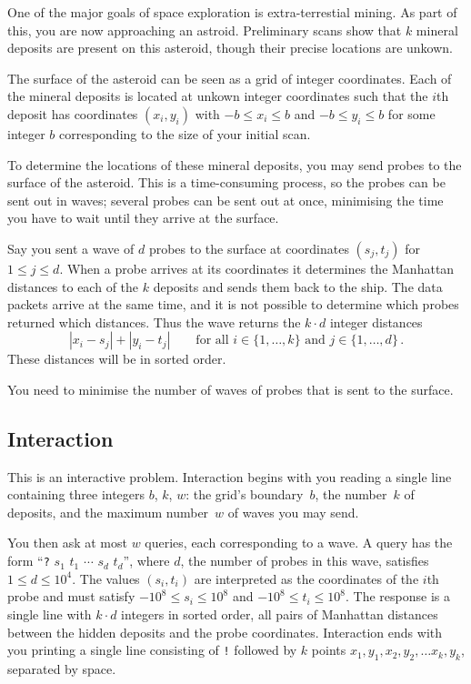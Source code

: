 
One of the major goals of space exploration is extra-terrestial mining. 
As part of this, you are now approaching an astroid. 
Preliminary scans show that $k$ mineral deposits are present on this asteroid, though their precise locations are unkown.

\medskip

The surface of the asteroid can be seen as a grid of integer coordinates.
Each of the mineral deposits is located at unkown integer coordinates such that the $i$th deposit has coordinates $(x_i, y_i)$ with  
$-b \le x_i \le b$ and $-b\le y_i \le b$ %
for some integer $b$ corresponding to the size of your initial scan.

To determine the locations of these mineral deposits, you may send probes to the surface of the asteroid. 
This is a time-consuming process, so the probes can be sent out in waves;
several probes can be sent out at once, minimising the time you have to wait until they arrive at the surface.

Say you sent a wave of $d$ probes to the surface at coordinates $(s_j,t_j)$ for $1\leq j\leq d$.
When a probe arrives at its coordinates it determines the Manhattan distances to each of the $k$ deposits and sends them back to the ship. 
The data packets arrive at the same time, and it is not possible to determine which probes returned which distances. 
Thus the wave returns the $k\cdot d$ integer distances
\[|x_i-s_j| + |y_i - t_j| \qquad\text{for all } i \in \{1,\ldots,k\} \text{ and } j \in\{ 1,\ldots,d\}\,.\]
These distances will be in sorted order.

You need to minimise the number of waves of probes that is sent to the surface.

\subsection*{Interaction}

This is an interactive problem.
Interaction begins with you reading a single line containing three integers $b$, $k$, $w$:
the grid's boundary~$b$,
the number~$k$ of deposits,
and the maximum number~$w$ of waves you may send.

You then ask at most $w$ queries, each corresponding to a wave.
A query has the form ``\texttt{?} $s_1$ $t_1$ $\cdots$ $s_d$ $t_d$'', where $d$, the number of probes in this wave, satisfies
$1\leq d\leq 10^4$. %
The values $(s_i,t_i)$ are interpreted as the coordinates of the $i$th probe and must satisfy
$-10^8 \leq s_i \leq 10^8$ and $-10^8 \leq t_i \leq 10^8$. %
The response is a single line with $k \cdot d$ integers in sorted order, all pairs of Manhattan distances between the hidden deposits and the probe coordinates.
Interaction ends with you printing a single line consisting of \texttt{!} followed by $k$ points $x_1, y_1, x_2, y_2, \ldots x_k, y_k$, separated by space.

